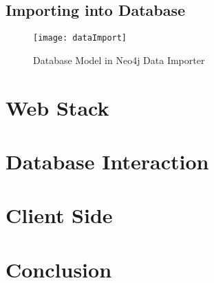 \subsection{Importing into Database}
\begin{figure}[H]
    \centering
    \texttt{[image: dataImport]}
    \caption{Database Model in Neo4j Data Importer}
\end{figure}
\section{Web Stack}
\section{Database Interaction}
\section{Client Side}
\section{Conclusion}